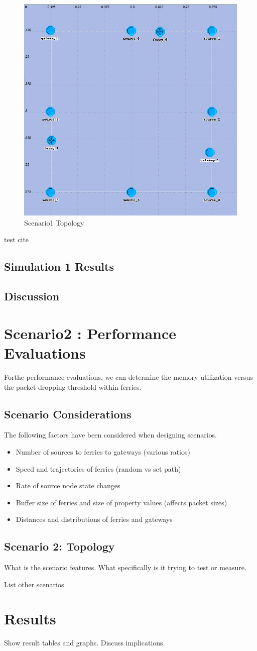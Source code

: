 \begin{figure}[h]
    \centering
    \includegraphics[width=.5\textwidth]{images/scenario1-test}
    \caption{Scenario1 Topology}
    \label{fig:scenario1}
\end{figure}
test cite ~\cite{s:wearable}

\subsection{Simulation 1 Results}

\subsection{Discussion}





\section{Scenario2 : Performance Evaluations}
\label{sec:scenario2}

Forthe performance evaluations, we can determine the memory utilization versus the packet dropping threshold within ferries.  

\subsection{Scenario Considerations}

The following factors have been considered when designing scenarios.
\begin{itemize}
\item Number of sources to ferries to gateways (various ratios)
\item Speed and trajectories of ferries (random vs set path)
\item Rate of source node state changes
\item Buffer size of ferries and size of property values (affects packet sizes)
\item Distances and distributions of ferries and gateways
\end{itemize}

\subsection{Scenario 2: Topology}

What is the scenario features. 
What specifically is it trying to test or measure.

List other scenarios

\section{Results}

Show result tables and graphs.
Discuss implications.
